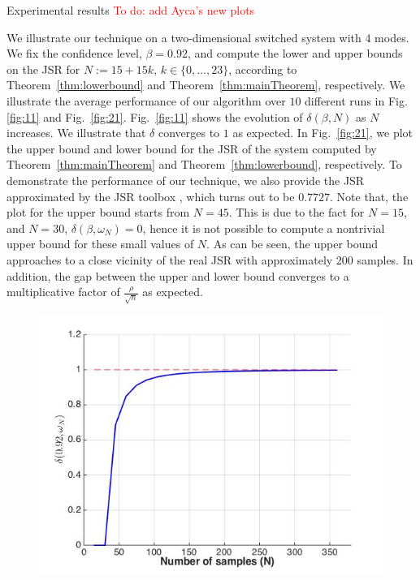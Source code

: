 \begin{subsection}{Experimental results}
\textcolor{red}{To do: add Ayca's new plots}

We illustrate our technique on a two-dimensional switched system with $4$ modes. We fix the confidence level, \mbox{$\beta = 0.92$}, and compute the lower and upper bounds on the JSR for $N:=15+15k,\, k \in\{0, \ldots, 23\}$, according to Theorem~\ref{thm:lowerbound} and Theorem~\ref{thm:mainTheorem}, respectively. We illustrate the average performance of our algorithm over $10$ different runs in Fig.~ \ref{fig:11} and Fig.~\ref{fig:21}. Fig.~\ref{fig:11} shows the evolution of $\delta(\beta, N)$ as $N$ increases. We illustrate that $\delta$ converges to $1$ as expected. In Fig.~\ref{fig:21}, we plot the upper bound and lower bound for the JSR of the system computed by Theorem~\ref{thm:mainTheorem} and Theorem~\ref{thm:lowerbound}, respectively. To demonstrate the performance of our technique, we also provide the JSR approximated by the JSR toolbox \cite{jsrtoolbox}, which turns out to be $0.7727$. Note that, the plot for the upper bound starts from $N=45$. This is due to the fact for $N=15$, and $N=30$, $\delta(\beta, \omega_N) = 0$, hence it is not possible to compute a nontrivial upper bound for these small values of $N$. As can be seen, the upper bound approaches to a close vicinity of the real JSR with approximately 200 samples. In addition, the gap between the upper and lower bound converges to a multiplicative factor of $\frac{\rho}{\sqrt{n}}$ as expected.

\begin{figure}
\begin{center}
\includegraphics[trim = 5mm 5mm 5mm 5mm, scale=0.35]{delta1.jpg}


\end{center}
\end{figure}
\end{subsection}
